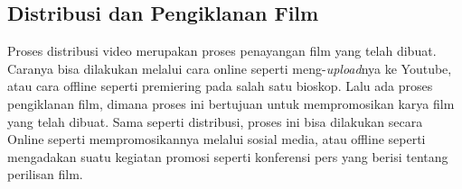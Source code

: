 \documentclass[12pt]{article}
\begin{document}
    \subsection{Distribusi dan Pengiklanan Film}
    Proses distribusi video merupakan proses penayangan film yang telah dibuat. Caranya bisa dilakukan melalui cara online seperti meng-\textit{upload}nya ke Youtube, atau cara offline seperti premiering pada salah satu bioskop. Lalu ada proses pengiklanan film, dimana proses ini bertujuan untuk mempromosikan karya film yang telah dibuat. Sama seperti distribusi, proses ini bisa dilakukan secara Online seperti mempromosikannya melalui sosial media, atau offline seperti mengadakan suatu kegiatan promosi seperti konferensi pers yang berisi tentang perilisan film.
\end{document}
